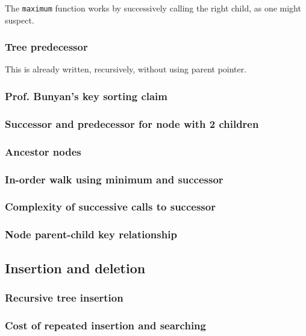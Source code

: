 \documentclass{article}
\begin{document}
The \texttt{maximum} function works by successively calling the right
child, as one might suspect.

\subsubsection{Tree predecessor}

This is already written, recursively, without using parent pointer.


\subsubsection{Prof. Bunyan's key sorting claim}

\subsubsection{Successor and predecessor for node with 2 children}

\subsubsection{Ancestor nodes}

\subsubsection{In-order walk using minimum and successor}

\subsubsection{Complexity of successive calls to successor}

\subsubsection{Node parent-child key relationship}


\subsection{Insertion and deletion}

\subsubsection{Recursive tree insertion}

\subsubsection{Cost of repeated insertion and searching}
\end{document}
